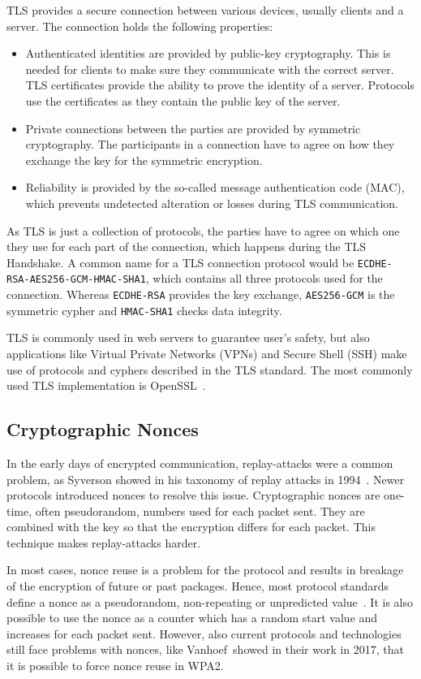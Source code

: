 TLS provides a secure connection between various devices, usually clients and a
server. The connection holds the following properties:
\begin{itemize}
  \item Authenticated identities are provided by public-key cryptography. This
is needed for clients to make sure they communicate with the correct server. TLS
certificates provide the ability to prove the identity of a server. Protocols
use the certificates as they contain the public key of the server.
  \item Private connections between the parties are provided by symmetric
cryptography. The participants in a connection have to agree on how they
exchange the key for the symmetric encryption.
  \item Reliability is provided by the so-called message authentication code
(MAC), which prevents undetected alteration or losses during TLS communication.
\end{itemize}

As TLS is just a collection of protocols, the parties have to agree on which one
they use for each part of the connection, which happens during the TLS
Handshake. A common name for a TLS connection protocol would be
\texttt{ECDHE-RSA-AES256-GCM-HMAC-SHA1}, which contains all three protocols used
for the connection. Whereas \texttt{ECDHE-RSA} provides the key exchange,
\texttt{AES256-GCM} is the  symmetric cypher and \texttt{HMAC-SHA1} checks data
integrity.

TLS is commonly used in web servers to guarantee user's safety, but also
applications like Virtual Private Networks (VPNs) and Secure Shell (SSH) make
use of protocols and cyphers described in the TLS standard. The most commonly
used TLS implementation is OpenSSL~\cite{opensslweb}.

\subsection{Cryptographic Nonces}

In the early days of encrypted communication, replay-attacks were a common
problem, as Syverson showed in his taxonomy of replay attacks in
1994~\cite{replaytax}. Newer protocols introduced nonces to resolve this issue.
Cryptographic nonces are one-time, often pseudorandom, numbers used for each
packet sent. They are combined with the key so that the encryption differs for
each packet. This technique makes replay-attacks harder.

In most cases, nonce reuse is a problem for the protocol and results in breakage
of the encryption of future or past packages. Hence, most protocol standards
define a nonce as a pseudorandom, non-repeating or unpredicted
value~\cite{noncegeneral}. It is also possible to use the nonce as a counter
which has a random start value and increases for each packet sent. However, also
current protocols and technologies still face problems with nonces, like
Vanhoef~\etal showed in their work in 2017, that it is possible to force nonce
reuse in WPA2\cite{wpanoncereuse}.

